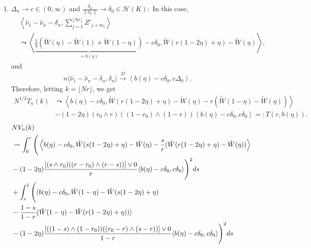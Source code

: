 \documentclass[11pt]{article}
\newcommand{\bP}{\mathbb{P}}
\theoremstyle{plain}
\theoremstyle{definition}
\theoremstyle{remark}
\begin{document}
\begin{appendix}
\begin{enumerate}
    Therefore,
    $$G_n=\sup_{k=1,2,\cdots,N-1} T_n(k)/V^{1/2}_n(k)\geq T_n(\lfloor N r_0 \rfloor)/V_n(\lfloor N r_0 \rfloor)\overset{\bP}{\to}\infty,$$
    which implies that $\bP(G_n>G_{1-\alpha})\to 1.$
    \item $\Delta_n\to c\in(0,\infty)$ and $\frac{\delta_n}{\left\|\delta_n\right\|}\to \delta_0\in \mathcal{H}(K):$ In this case,
    \begin{align*}
        &\left\langle\hat{\nu}_1-\hat{\nu}_n-\delta_n, \sum_{j=1}^{\lfloor Nr \rfloor} Z'_{j+m_1}\right\rangle \\
        &\leadsto \left\langle \underbrace{\frac{1}{\eta}( \tilde{W}(\eta)-\tilde{W}(1)+\tilde{W}(1-\eta))}_{=b(\eta)}-c\delta_0,\tilde{W}(r(1-2\eta)+\eta)-\tilde{W}(\eta)\right \rangle,
    \end{align*}
    and
    \begin{align*}
        n \langle \hat{\nu}_1-\hat{\nu}_n-\delta_n, \delta_n \rangle \overset{D}{\to} \left\langle b(\eta)-c\delta_0, c\Delta_0\right \rangle.
    \end{align*}
    Therefore, letting $k=\lfloor Nr \rfloor$, we get
    \begin{align*}
        N^{1/2} T_n(k) &\leadsto \left\langle b(\eta)-c\delta_0, \tilde{W}(r(1-2\eta)+\eta)-\tilde{W}(\eta)-r(\tilde{W}(1-\eta)-\tilde{W}(\eta))\right \rangle\\
        &-(1-2\eta)(r_0\wedge r)((1-r_0)\wedge (1-r))\left\langle b(\eta)-c\delta_0, c\delta_0\right \rangle=:T(r,b(\eta)).
        \end{align*}
        \begin{align*}
            &NV_n(k)\\
            &\leadsto \int_{0}^{r} \Bigg(\left \langle b(\eta)-c\delta_0, \tilde{W}(s(1-2\eta)+\eta)-\tilde{W}(\eta)-\frac{s}{r}(\tilde{W}(r(1-2\eta)+\eta)-\tilde{W}(\eta))\right \rangle\\
            &-(1-2\eta)\frac{[(s \wedge r_0)((r-r_0)\wedge (r-s))]\vee 0}{r}\langle b(\eta)-c\delta_0, c\delta_0 \rangle \Bigg)^2 ds\allowdisplaybreaks\\
            &+\int_{r}^{1} \Bigg( \langle b(\eta)-c\delta_0, \tilde{W}(1-\eta)-\tilde{W}(s(1-2\eta)+\eta)\\
            &-\frac{1-s}{1-r}(\tilde{W}(1-\eta)-\tilde{W}(r(1-2\eta)+\eta)) \rangle\\
            &-(1-2\eta)\frac{[((1-s) \wedge (1-r_0))((r_0-r)\wedge (s-r))]\vee 0}{1-r}\langle b(\eta)-c\delta_0, c\delta_0 \rangle \Bigg)^2 ds\\

\end{align*}
\end{enumerate}
\end{appendix}
\end{document}
